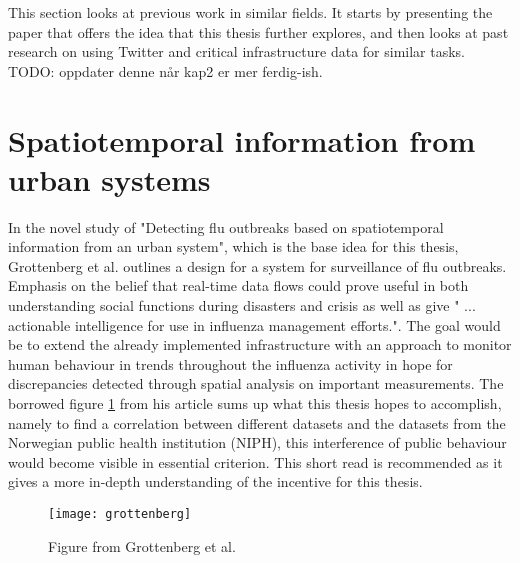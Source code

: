 This section looks at previous work in similar fields. It starts by presenting the paper that offers the idea that this thesis further explores, and then looks at past research on using Twitter and critical infrastructure data for similar tasks. TODO: oppdater denne når kap2 er mer ferdig-ish.

\section{Spatiotemporal information from urban systems}
In the novel study of "Detecting flu outbreaks based on spatiotemporal information from an urban system", which is the base idea for this thesis, Grottenberg et al. \cite{spatiotemp_urban_sys} outlines a design for a system for surveillance of flu outbreaks. Emphasis on the belief that real-time data flows could prove useful in both understanding social functions during disasters and crisis as well as give " ... actionable intelligence for use in influenza management efforts.". The goal would be to extend the already implemented infrastructure with an approach to monitor human behaviour in trends throughout the influenza activity in hope for discrepancies detected through spatial analysis on important measurements. The borrowed figure \ref{fig:grottenberg} from his article sums up what this thesis hopes to accomplish, namely to find a correlation between different datasets and the datasets from the Norwegian public health institution (NIPH), this interference of public behaviour would become visible in essential criterion.
This short read \cite{spatiotemp_urban_sys} is recommended as it gives a more in-depth understanding of the incentive for this thesis.

\begin{figure}[h]
\texttt{[image: grottenberg]}
\centering
\caption{Figure from Grottenberg et al. \cite{spatiotemp_urban_sys}}
\label{fig:grottenberg}
\end{figure}

